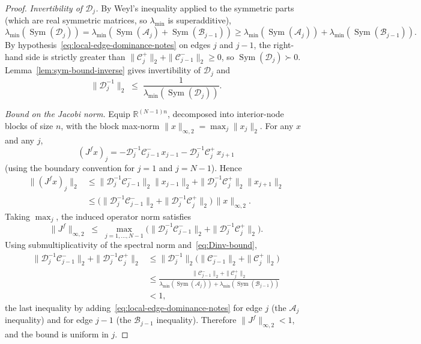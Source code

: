\documentclass{article}
\newcommand{\RR}{\mathbb{R}}
\newcommand{\Sym}{\operatorname{Sym}}
\begin{document}
\begin{proof}
    \emph{Invertibility of $\mathcal{D}_j$.} By Weyl's inequality applied to the
    symmetric parts (which are real symmetric matrices, so $\lambda_{\min}$ is
    superadditive),
    \[
        \lambda_{\min}(\Sym(\mathcal{D}_j))
        = \lambda_{\min}(\Sym(\mathcal{A}_j) + \Sym(\mathcal{B}_{j-1}))
        \geq \lambda_{\min}(\Sym(\mathcal{A}_j)) + \lambda_{\min}(\Sym(\mathcal{B}_{j-1})).
    \]
    By hypothesis~\eqref{eq:local-edge-dominance-notes} on edges $j$ and $j-1$,
    the right-hand side is strictly greater than
    $\|\mathcal{C}^+_j\|_2 + \|\mathcal{C}^-_{j-1}\|_2 \geq 0$, so
    $\Sym(\mathcal{D}_j) \succ 0$. Lemma~\ref{lem:sym-bound-inverse} gives
    invertibility of $\mathcal{D}_j$ and
    \begin{equation}
        \|\mathcal{D}_j^{-1}\|_2 \;\leq\; \frac{1}{\lambda_{\min}(\Sym(\mathcal{D}_j))}.
        \label{eq:Dinv-bound}
    \end{equation}

    \emph{Bound on the Jacobi norm.} Equip $\RR^{(N-1)n}$, decomposed into
    interior-node blocks of size $n$, with the block max-norm
    $\|x\|_{\infty, 2} = \max_j \|x_j\|_2$. For any $x$ and any $j$,
    \[
        (J^f x)_j = -\mathcal{D}_j^{-1} \mathcal{C}^-_{j-1}\, x_{j-1}
                    - \mathcal{D}_j^{-1} \mathcal{C}^+_j\, x_{j+1}
    \]
    (using the boundary convention for $j = 1$ and $j = N-1$). Hence
    \begin{align*}
        \|(J^f x)_j\|_2
        &\leq \|\mathcal{D}_j^{-1} \mathcal{C}^-_{j-1}\|_2 \|x_{j-1}\|_2
             + \|\mathcal{D}_j^{-1} \mathcal{C}^+_j\|_2 \|x_{j+1}\|_2 \\
        &\leq \bigl(\|\mathcal{D}_j^{-1} \mathcal{C}^-_{j-1}\|_2 + \|\mathcal{D}_j^{-1} \mathcal{C}^+_j\|_2\bigr) \, \|x\|_{\infty, 2}.
    \end{align*}
    Taking $\max_j$, the induced operator norm satisfies
    \[
        \|J^f\|_{\infty, 2}
        \;\leq\; \max_{j=1, \ldots, N-1}
            \bigl( \|\mathcal{D}_j^{-1} \mathcal{C}^-_{j-1}\|_2
                  + \|\mathcal{D}_j^{-1} \mathcal{C}^+_j\|_2 \bigr).
    \]
    Using submultiplicativity of the spectral norm and~\eqref{eq:Dinv-bound},
    \begin{align*}
        \|\mathcal{D}_j^{-1} \mathcal{C}^-_{j-1}\|_2 + \|\mathcal{D}_j^{-1} \mathcal{C}^+_j\|_2
        &\leq \|\mathcal{D}_j^{-1}\|_2\bigl(\|\mathcal{C}^-_{j-1}\|_2 + \|\mathcal{C}^+_j\|_2\bigr) \\
        &\leq \frac{\|\mathcal{C}^-_{j-1}\|_2 + \|\mathcal{C}^+_j\|_2}{\lambda_{\min}(\Sym(\mathcal{A}_j)) + \lambda_{\min}(\Sym(\mathcal{B}_{j-1}))} \\
        &< 1,
    \end{align*}
    the last inequality by adding~\eqref{eq:local-edge-dominance-notes} for edge $j$
    (the $\mathcal{A}_j$ inequality) and for edge $j-1$ (the $\mathcal{B}_{j-1}$
    inequality). Therefore $\|J^f\|_{\infty, 2} < 1$, and the bound is uniform in $j$.


\end{proof}
\end{document}
